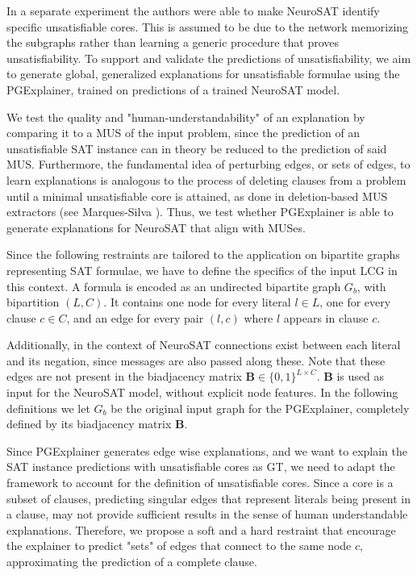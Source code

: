 In a separate experiment the authors were able to make NeuroSAT identify specific unsatisfiable cores. This is assumed to be due to the network memorizing the subgraphs rather than learning a generic procedure that proves unsatisfiability. To support and validate the predictions of unsatisfiability, we aim to generate global, generalized explanations for unsatisfiable formulae using the PGExplainer, trained on predictions of a trained NeuroSAT model.

We test the quality and "human-understandability" of an explanation by comparing it to a MUS of the input problem, since the prediction of an unsatisfiable SAT instance can in theory be reduced to the prediction of said MUS. Furthermore, the fundamental idea of perturbing edges, or sets of edges, to learn explanations is analogous to the process of deleting clauses from a problem until a minimal unsatisfiable core is attained, as done in deletion-based MUS extractors (see Marques-Silva \cite{5489199}). Thus, we test whether PGExplainer is able to generate explanations for NeuroSAT that align with MUSes. \bigskip

Since the following restraints are tailored to the application on bipartite graphs representing SAT formulae, we have to define the specifics of the input LCG in this context. A formula is encoded as an undirected bipartite graph $G_b$, with bipartition $(L,C)$. It contains one node for every literal $l \in L$, one for every clause $c \in C$, and an edge for every pair $(l,c)$ where $l$ appears in clause $c$. 

Additionally, in the context of NeuroSAT connections exist between each literal and its negation, since messages are also passed along these. Note that these edges are not present in the biadjacency matrix $\mathbf{B}\in \{0,1\}^{L\times C}$. $\mathbf{B}$ is used as input for the NeuroSAT model, without explicit node features. In the following definitions we let $G_b$ be the original input graph for the PGExplainer, completely defined by its biadjacency matrix $\mathbf{B}$. \bigskip


Since PGExplainer generates edge wise explanations, and we want to explain the SAT instance predictions with unsatisfiable cores as \ac{GT}, we need to adapt the framework to account for the definition of unsatisfiable cores. Since a core is a subset of clauses, predicting singular edges that represent literals being present in a clause, may not provide sufficient results in the sense of human understandable explanations. Therefore, we propose a soft and a hard restraint that encourage the explainer to predict "sets" of edges that connect to the same node $c$, approximating the prediction of a complete clause.

